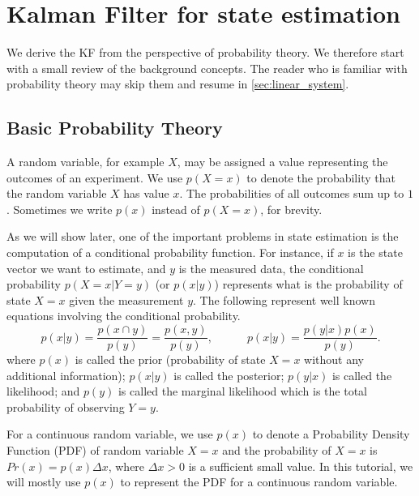 \section{Kalman Filter for state estimation} \label{sec:kf}

We derive the KF from the perspective of probability theory.
We therefore start with a small review of the background concepts. 
The reader who is familiar with probability theory may skip them and resume in \cref{sec:linear_system}.

\subsection{Basic Probability Theory}
\label{sec:background_probability}

A random variable, for example $X$, may be assigned a value representing the outcomes of an experiment. 
We use $p(X=x)$ to denote the probability that the random variable $X$ has value $x$. 
The probabilities of all outcomes sum up to $1$. 
Sometimes we write $p(x)$ instead of $p(X=x)$, for brevity.

As we will show later, one of the important problems in state estimation is the computation of a conditional probability function. 
For instance, if $x$ is the state vector we want to estimate, and $y$ is the measured data, the conditional probability $p(X=x|Y=y)$ (or $p(x|y)$) represents what is the probability of state $X=x$ given the measurement $y$.
The following represent well known equations involving the conditional probability. 
\begin{equation}
	\label{equ:conditional_prob}
	p(x|y) = \frac{p(x\cap y)}{p(y)} = \frac{p(x, y)}{p(y)}, \hspace{3em}
  p(x|y) = \frac{p(y|x)p(x)}{p(y)}.     
\end{equation}
where 
$p(x)$ is called the prior (probability of state $X=x$ without any additional information);
$p(x|y)$ is called the posterior;
$p(y|x)$ is called the likelihood; and
$p(y)$ is called the marginal likelihood which is the total probability of observing $Y=y$.

\begin{remark}\label{remark:ct_prob}
	For a continuous random variable, we use $p(x)$ to denote a Probability Density Function (PDF) of random variable $X=x$ and the probability of $X=x$ is $Pr(x)=p(x)\Delta x$, where $\Delta x > 0$ is a sufficient small value. 
	In this tutorial, we will mostly use $p(x)$ to represent the PDF for a continuous random variable. 
\end{remark}

